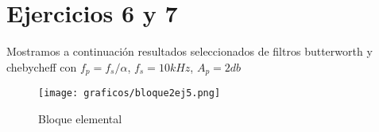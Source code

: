\documentclass[assd_tp3_main.tex]{subfiles}
\begin{document}
\section{Ejercicios 6 y 7}
Mostramos a continuación resultados seleccionados de filtros butterworth y chebycheff con
$f_p=f_s/\alpha$, $f_s=10kHz$, $A_p=2db$

\begin{figure}[H]	
	\centering
	\texttt{[image: graficos/bloque2ej5.png]}
	\caption{Bloque elemental}
	\label{fig:bloqueElemental}
\end{figure}
\end{document}

